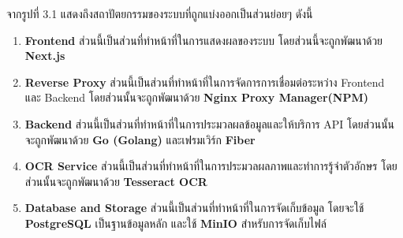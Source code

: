   จากรูปที่ 3.1 แสดงถึงสถาปัตยกรรมของระบบที่ถูกแบ่งออกเป็นส่วนย่อยๆ ดังนี้
  \begin{enumerate}
    \item \textbf{Frontend} ส่วนนี้เป็นส่วนที่ทำหน้าที่ในการแสดงผลของระบบ โดยส่วนนี้จะถูกพัฒนาด้วย \textbf{Next.js}
    \item \textbf{Reverse Proxy} ส่วนนี้เป็นส่วนที่ทำหน้าที่ในการจัดการการเชื่อมต่อระหว่าง Frontend และ Backend
    โดยส่วนนั้นจะถูกพัฒนาด้วย \textbf{Nginx Proxy Manager(NPM)}
    \item \textbf{Backend} ส่วนนี้เป็นส่วนที่ทำหน้าที่ในการประมวลผลข้อมูลและให้บริการ API โดยส่วนนั้นจะถูกพัฒนาด้วย
    \textbf{Go (Golang)} และเฟรมเวิร์ก \textbf{Fiber}
    \item \textbf{OCR Service} ส่วนนี้เป็นส่วนที่ทำหน้าที่ในการประมวลผลภาพและทำการรู้จำตัวอักษร โดยส่วนนั้นจะถูกพัฒนาด้วย \textbf{Tesseract OCR}
    \item \textbf{Database and Storage} ส่วนนี้เป็นส่วนที่ทำหน้าที่ในการจัดเก็บข้อมูล โดยจะใช้ \textbf{PostgreSQL}
    เป็นฐานข้อมูลหลัก และใช้ \textbf{MinIO} สำหรับการจัดเก็บไฟล์
  \end{enumerate}

